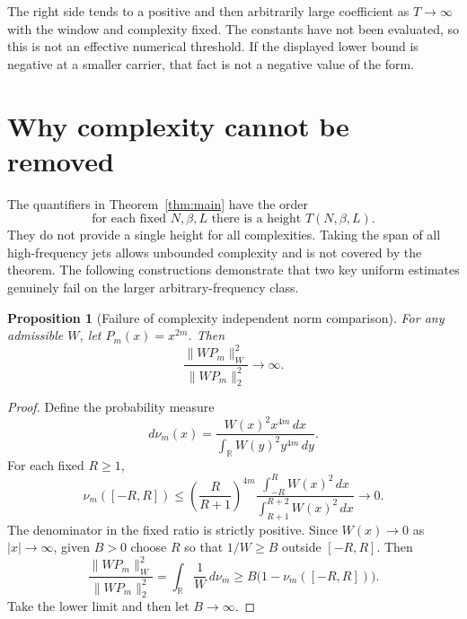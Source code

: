 \documentclass[11pt]{article}
\newtheorem{proposition}[theorem]{Proposition}
\theoremstyle{definition}
\theoremstyle{remark}
\newcommand{\R}{\mathbb R}
\newcommand{\norm}[1]{\lVert #1\rVert}
\newcommand{\dd}{\,dx}
\begin{document}
The right side tends to a positive and then arbitrarily large coefficient
as $T\to\infty$ with the window and complexity fixed. The constants have
not been evaluated, so this is not an effective numerical threshold.
If the displayed lower bound is negative at a smaller carrier, that fact
is not a negative value of the form.

\section{Why complexity cannot be removed}\label{sec:limits}

The quantifiers in Theorem~\ref{thm:main} have the order
\[
 \text{for each fixed }N,\beta,L\text{ there is a height }T(N,\beta,L).
\]
They do not provide a single height for all complexities. Taking the span
of all high-frequency jets allows unbounded complexity and is not covered
by the theorem. The following constructions demonstrate that two key
uniform estimates genuinely fail on the larger arbitrary-frequency class.

\begin{proposition}[Failure of complexity independent norm comparison]\label{prop:norm-counter}
For any admissible $W$, let $P_m(x)=x^{2m}$. Then
\begin{equation}\label{eq:norm-counter}
 \frac{\norm{WP_m}_W^2}{\norm{WP_m}_2^2}\longrightarrow\infty.
\end{equation}
\end{proposition}
\begin{proof}
Define the probability measure
\[
 d\nu_m(x)=\frac{W(x)^2x^{4m}\dd}{\int_\R W(y)^2y^{4m}\,dy}.
\]
For each fixed $R\ge1$,
\[
 \nu_m([-R,R])\le
 \left(\frac R{R+1}\right)^{4m}
 \frac{\int_{-R}^R W(x)^2\dd}{\int_{R+1}^{R+2}W(x)^2\dd}
 \longrightarrow0.
\]
The denominator in the fixed ratio is strictly positive. Since
$W(x)\to0$ as $|x|\to\infty$, given $B>0$ choose $R$ so that
$1/W\ge B$ outside $[-R,R]$. Then
\[
 \frac{\norm{WP_m}_W^2}{\norm{WP_m}_2^2}
 =\int_\R\frac1W\,d\nu_m
 \ge B\bigl(1-\nu_m([-R,R])\bigr).
\]
Take the lower limit and then let $B\to\infty$.
\end{proof}
\end{document}
